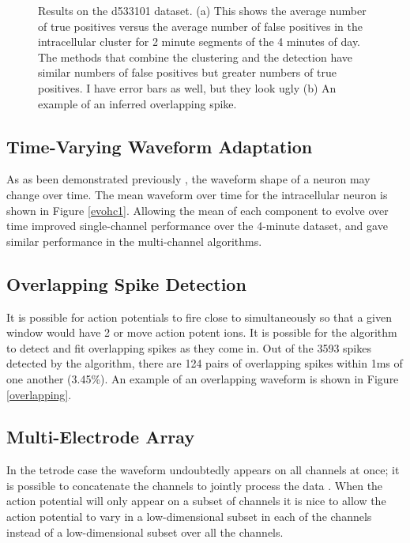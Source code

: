\begin{center}
\begin{figure}
\caption{Results on the d533101 dataset.  (a) This shows the average number of true positives versus the average number of false positives in the intracellular cluster for 2 minute segments of the 4 minutes of day.  The methods that combine the clustering and the detection have similar numbers of false positives but greater numbers of true positives. {\color{red} I have error bars as well, but they look ugly}  (b) An example of an inferred overlapping spike.}
\end{figure}
\end{center}

\subsection{Time-Varying Waveform Adaptation} \label{sub:adapt}
As as been demonstrated previously \cite{calabrese2011kalman}, the waveform shape of a neuron may change over time.  The mean waveform over time for the intracellular neuron is shown in Figure \ref{evohc1}.  Allowing the mean of each component to evolve over time improved single-channel performance over the 4-minute dataset, and gave similar performance in the multi-channel algorithms.
\subsection{Overlapping Spike Detection}
It is possible for action potentials to fire close to simultaneously so that a given window would have 2 or move action potent ions.  It is possible for the algorithm to detect and fit overlapping spikes as they come in.  Out of the 3593 spikes detected by the algorithm, there are 124 pairs of overlapping spikes within 1ms of one another (3.45\%).  An example of an overlapping waveform is shown in Figure \ref{overlapping}.

\subsection{Multi-Electrode Array} \label{sub:multi}

In the tetrode case the waveform undoubtedly appears on all channels at once; it is possible to concatenate the channels to jointly process the data \cite{wood2009}.  When the action potential will only appear on a subset of channels it is nice to allow the action potential to vary in a low-dimensional subset in each of the channels instead of a low-dimensional subset over all the channels. \cite{Prentice2011}

